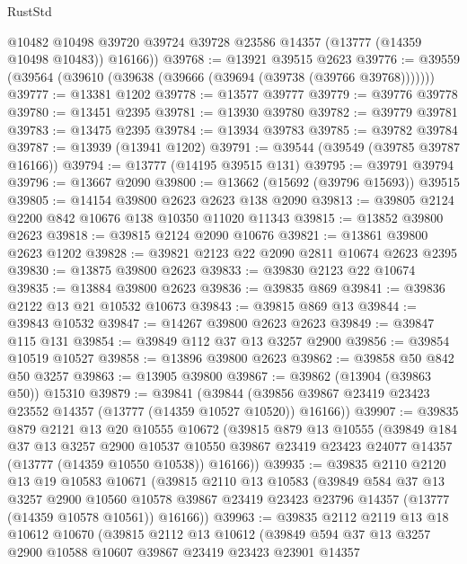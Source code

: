 \begin{lexlean}{RustStd}
\begin{coremodule}
        @10482
        @10498
        @39720
        @39724
        @39728
        @23586
        @14357
        (@13777 (@14359 @10498 @10483))
        @16166))
@39768 := @13921 @39515 @2623
@39776 := @39559 (@39564 (@39610 (@39638 (@39666 (@39694 (@39738 (@39766 @39768)))))))
@39777 := @13381 @1202
@39778 := @13577 @39777
@39779 := @39776 @39778
@39780 := @13451 @2395
@39781 := @13930 @39780
@39782 := @39779 @39781
@39783 := @13475 @2395
@39784 := @13934 @39783
@39785 := @39782 @39784
@39787 := @13939 (@13941 @1202)
@39791 := @39544 (@39549 (@39785 @39787 @16166))
@39794 := @13777 (@14195 @39515 @131)
@39795 := @39791 @39794
@39796 := @13667 @2090
@39800 := @13662 (@15692 (@39796 @15693)) @39515
@39805 := @14154 @39800 @2623 @2623 @138 @2090
@39813 := @39805 @2124 @2200 @842 @10676 @138 @10350 @11020 @11343
@39815 := @13852 @39800 @2623
@39818 := @39815 @2124 @2090 @10676
@39821 := @13861 @39800 @2623 @1202
@39828 := @39821 @2123 @22 @2090 @2811 @10674 @2623 @2395
@39830 := @13875 @39800 @2623
@39833 := @39830 @2123 @22 @10674
@39835 := @13884 @39800 @2623
@39836 := @39835 @869
@39841 := @39836 @2122 @13 @21 @10532 @10673
@39843 := @39815 @869 @13
@39844 := @39843 @10532
@39847 := @14267 @39800 @2623 @2623
@39849 := @39847 @115 @131
@39854 := @39849 @112 @37 @13 @3257 @2900
@39856 := @39854 @10519 @10527
@39858 := @13896 @39800 @2623
@39862 := @39858 @50 @842 @50 @3257
@39863 := @13905 @39800
@39867 := @39862 (@13904 (@39863 @50)) @15310
@39879 := @39841
    (@39844 (@39856 @39867 @23419 @23423 @23552 @14357 (@13777 (@14359 @10527 @10520)) @16166))
@39907 := @39835
    @879
    @2121
    @13
    @20
    @10555
    @10672
    (@39815
      @879
      @13
      @10555
      (@39849
        @184
        @37
        @13
        @3257
        @2900
        @10537
        @10550
        @39867
        @23419
        @23423
        @24077
        @14357
        (@13777 (@14359 @10550 @10538))
        @16166))
@39935 := @39835
    @2110
    @2120
    @13
    @19
    @10583
    @10671
    (@39815
      @2110
      @13
      @10583
      (@39849
        @584
        @37
        @13
        @3257
        @2900
        @10560
        @10578
        @39867
        @23419
        @23423
        @23796
        @14357
        (@13777 (@14359 @10578 @10561))
        @16166))
@39963 := @39835
    @2112
    @2119
    @13
    @18
    @10612
    @10670
    (@39815
      @2112
      @13
      @10612
      (@39849
        @594
        @37
        @13
        @3257
        @2900
        @10588
        @10607
        @39867
        @23419
        @23423
        @23901
        @14357

\end{coremodule}
\end{lexlean}
